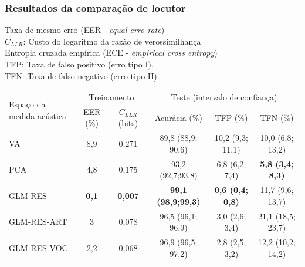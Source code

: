 \documentclass[121pt, aspectratio=169, t]{beamer}
\begin{document}
\begin{frame}[fragile=singleslide]
	\frametitle{Resultados da comparação de locutor}
	Taxa de mesmo erro (EER - \textit{equal erro rate})\\
	$C_{LLR}$: Custo do logaritmo da razão de verossimilhança\\
	Entropia cruzada empírica (ECE - \textit{empirical cross entropy})\\
	TFP: Taxa de falso positivo (erro tipo I).\\
	TFN: Taxa de falso negativo (erro tipo II).
	
	\begin{table}[]
		\small
		\begin{tabular}{@{}l|cc|ccc@{}}
			\toprule
			\multirow{2}{*}{Espaço da medida acústica} & \multicolumn{2}{c|}{Treinamento} & \multicolumn{3}{c}{Teste (intervalo de confiança)}                            \\ \cmidrule(l){2-6}
			& EER (\%)       & $C_{LLR}$ (bits)       & Acurácia (\%)             & TFP (\%)                & TFN (\%)                \\ \midrule
			VA                                         & 8,9            & 0,271           & 89,8 (88,9; 90,6)         & 10,2 (9,3; 11,1)        & 10,0 (6,8; 13,2)        \\
			PCA                                        & 4,8            & 0,175           & 93,2 (92,7;93,8)          & 6,8 (6,2; 7,4)          & \textbf{5,8 (3,4; 8,3)} \\
			GLM-RES                                    & \textbf{0,1}   & \textbf{0,007}  & \textbf{99,1 (98,9;99,3)} & \textbf{0,6 (0,4; 0,8)} & 11,7 (9,6; 13,7)        \\
			GLM-RES-ART                                & 3              & 0,078           & 96,5 (96,1; 96,9)         & 3,0 (2,6; 3,4)          & 21,1 (18,5; 23,7)       \\
			GLM-RES-VOC                                & 2,2            & 0,068           & 96,9 (96,5; 97,2)         & 2,8 (2,5; 3,2)          & 12,2 (10,2; 14,2)       \\ \bottomrule
		\end{tabular}
	\end{table}
\end{frame}
\end{document}
